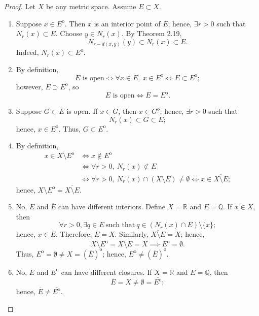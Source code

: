 \documentclass{amsart}
\theoremstyle{definition}
\begin{document}
\begin{proof}
    Let $X$ be any metric space. Assume $E \subset X$.
    \begin{enumerate}[label = (\alph*)]
        \item Suppose $x \in E^{\mathrm{o}}$. Then $x$ is an interior point of $E$; hence, $\exists r > 0$ such that $N_r(x) \subset E$. Choose $y \in N_r(x)$. By Theorem 2.19,
        \[
        N_{r-d(x,y)}(y) \subset N_r(x) \subset E.
        \]
        Indeed, $N_r(x) \subset E^{\mathrm{o}}$.
        \item By definition,
        \[
        \text{$E$ is open} \iff \forall x \in E, \ x \in E^{\mathrm{o}} \iff E \subset E^{\mathrm{o}};
        \]
        however, $E \supset E^{\mathrm{o}}$, so
        \[
        \text{$E$ is open} \iff E = E^{\mathrm{o}}.
        \]
        \item Suppose $G \subset E$ is open. If $x \in G$, then $x \in G^{\mathrm{o}}$; hence, $\exists r > 0$ such that 
        \[
        N_r(x) \subset G \subset E;
        \]
        hence, $x \in E^{\mathrm{o}}$. Thus, $G \subset E^{\mathrm{o}}$.
        \item By definition,
        \begin{align*}
            x \in X \setminus E^{\mathrm{o}} &\iff x \notin E^{\mathrm{o}} \\
            &\iff \forall r > 0, \ N_r(x) \not \subset E \\
            &\iff \forall r > 0, \ N_r(x) \cap (X \setminus E) \neq \emptyset \iff x \in \overline{X \setminus E};
        \end{align*}
        hence, $X \setminus E^{\mathrm{o}} = \overline{X \setminus E}$.
        \item No, $E$ and $\overline{E}$ can have different interiors. Define $X = \mathbb{R}$ and $E = \mathbb{Q}$. If $x \in X$, then
        \[
        \forall r > 0, \exists q \in E \ \text{such that} \ q \in (N_r(x) \cap E) \setminus \{x\};
        \]
        hence, $x \in \overline{E}$. Therefore, $\overline{E} = X$. Similarly, $\overline{X \setminus E} = X$; hence,
        \[
        X \setminus E^{\mathrm{o}} = \overline{X \setminus E} = X \implies E^{\mathrm{o}} = \emptyset.
        \]
        Thus, $E^{\mathrm{o}} = \emptyset \neq X = (\overline{E})^{\mathrm{o}}$; hence, $E^{\mathrm{o}} \neq (\overline{E})^{\mathrm{o}}$.        
        \item No, $E$ and $E^{\mathrm{o}}$ can have different closures. If $X = \mathbb{R}$ and $E = \mathbb{Q}$, then
        \[
        \overline{E} = X \neq \emptyset = \overline{E^{\mathrm{o}}};
        \]
        hence, $\overline{E} \neq \overline{E^{\mathrm{o}}}$.
    \end{enumerate}
\end{proof}
\end{document}
